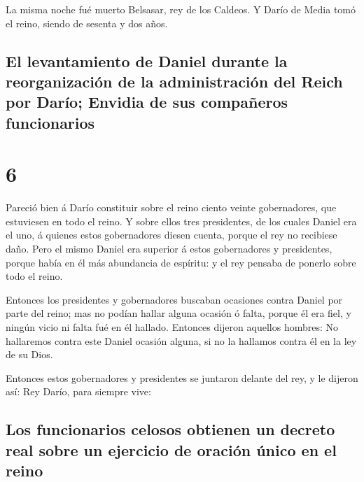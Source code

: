  La misma noche fué muerto Belsasar, rey de los Caldeos.
 Y Darío de Media tomó el reino, siendo de sesenta y dos
años.

\hypertarget{el-levantamiento-de-daniel-durante-la-reorganizaciuxf3n-de-la-administraciuxf3n-del-reich-por-daruxedo-envidia-de-sus-compauxf1eros-funcionarios}{%
\subsection{El levantamiento de Daniel durante la reorganización de la
administración del Reich por Darío; Envidia de sus compañeros
funcionarios}\label{el-levantamiento-de-daniel-durante-la-reorganizaciuxf3n-de-la-administraciuxf3n-del-reich-por-daruxedo-envidia-de-sus-compauxf1eros-funcionarios}}

\hypertarget{section-27-6}{%
\section{6}\label{section-27-6}}

 Pareció bien á Darío constituir sobre el reino ciento
veinte gobernadores, que estuviesen en todo el reino.  Y
sobre ellos tres presidentes, de los cuales Daniel era el uno, á quienes
estos gobernadores diesen cuenta, porque el rey no recibiese daño.
 Pero el mismo Daniel era superior á estos gobernadores y
presidentes, porque había en él más abundancia de espíritu: y el rey
pensaba de ponerlo sobre todo el reino.

 Entonces los presidentes y gobernadores buscaban
ocasiones contra Daniel por parte del reino; mas no podían hallar alguna
ocasión ó falta, porque él era fiel, y ningún vicio ni falta fué en él
hallado.  Entonces dijeron aquellos hombres: No hallaremos
contra este Daniel ocasión alguna, si no la hallamos contra él en la ley
de su Dios.

 Entonces estos gobernadores y presidentes se juntaron
delante del rey, y le dijeron así: Rey Darío, para siempre vive:

\hypertarget{los-funcionarios-celosos-obtienen-un-decreto-real-sobre-un-ejercicio-de-oraciuxf3n-uxfanico-en-el-reino}{%
\subsection{Los funcionarios celosos obtienen un decreto real sobre un
ejercicio de oración único en el
reino}\label{los-funcionarios-celosos-obtienen-un-decreto-real-sobre-un-ejercicio-de-oraciuxf3n-uxfanico-en-el-reino}}

